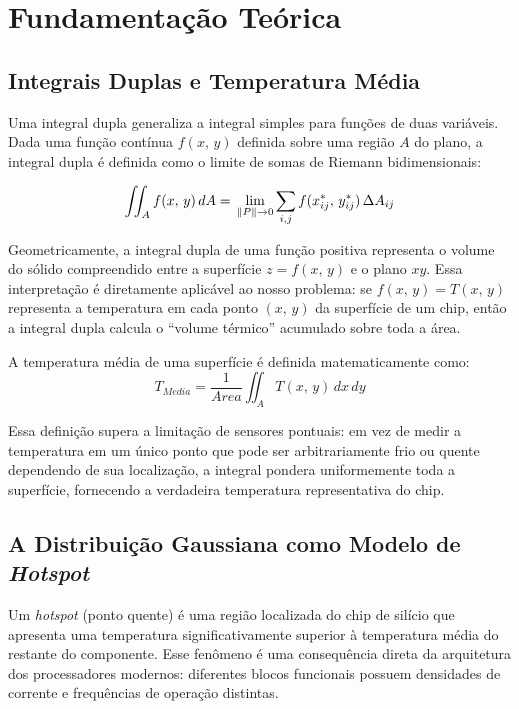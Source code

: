 


\section{Fundamentação Teórica}
\subsection{Integrais Duplas e Temperatura Média}
Uma integral dupla generaliza a integral simples para funções de duas variáveis. Dada uma função contínua $f(x,\,y)$ definida sobre uma região $A$ do plano, a integral dupla é definida como o limite de somas de Riemann bidimensionais:

$$ 
    \iint_A f(x,\,y) \, dA = \\
    \lim_{\|P\| \to 0} \sum_{i,j} f(x_{ij}^*,\, y_{ij}^*) \, \Delta A_{ij} 
$$

Geometricamente, a integral dupla de uma função positiva representa o volume do sólido compreendido entre a superfície $z = f(x,\,y)$ e o plano $xy$. Essa interpretação é diretamente aplicável ao nosso problema: se $f(x,\,y) = T(x,\,y)$ representa a temperatura em cada ponto $(x,\,y)$ da superfície de um chip, então a integral dupla calcula o ``volume térmico'' acumulado sobre toda a área.

A temperatura média de uma superfície é definida matematicamente como:
$$ T_{Media}=\frac{1}{Area} \iint_A T(x,\,y)\,dx\,dy $$

Essa definição supera a limitação de sensores pontuais: em vez de medir a temperatura em um único ponto que pode ser arbitrariamente frio ou quente dependendo de sua localização, a integral pondera uniformemente toda a superfície, fornecendo a verdadeira temperatura representativa do chip.

\subsection{A Distribuição Gaussiana como Modelo de \textit{Hotspot}}
Um \textit{hotspot} (ponto quente) é uma região localizada do chip de silício que apresenta uma temperatura significativamente superior à temperatura média do restante do componente. Esse fenômeno é uma consequência direta da arquitetura dos processadores modernos: diferentes blocos funcionais possuem densidades de corrente e frequências de operação distintas.

